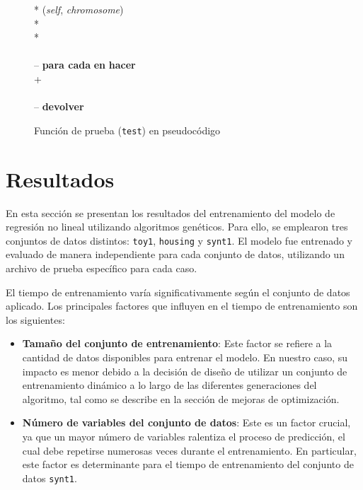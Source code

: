 \documentclass[conference,a4paper]{IEEEtran}
\begin{document}
\begin{figure}[h]
  \centering
  \begin{pseudo}*
    (\textit{self}, \textit{chromosome}) \\*
     \\*
     \\
    \textit{} \\--
    \textbf{para cada} \textit{} \textbf{en} \textit{} \textbf{hacer} \\+
        \textit{} \\
        \textit{} \\--
    \textbf{devolver} \textit{} \\
  \end{pseudo}
  \caption{Función de prueba (\texttt{test}) en pseudocódigo}
  \label{pcd:test}
\end{figure}










\section{Resultados}

En esta sección se presentan los resultados del entrenamiento del modelo de regresión no lineal utilizando algoritmos genéticos. Para ello, se emplearon tres conjuntos de datos distintos: \texttt{toy1}, \texttt{housing} y \texttt{synt1}. El modelo fue entrenado y evaluado de manera independiente para cada conjunto de datos, utilizando un archivo de prueba específico para cada caso.

El tiempo de entrenamiento varía significativamente según el conjunto de datos aplicado. Los principales factores que influyen en el tiempo de entrenamiento son los siguientes:

\begin{itemize}
    \item \textbf{Tamaño del conjunto de entrenamiento}: Este factor se refiere a la cantidad de datos disponibles para entrenar el modelo. En nuestro caso, su impacto es menor debido a la decisión de diseño de utilizar un conjunto de entrenamiento dinámico a lo largo de las diferentes generaciones del algoritmo, tal como se describe en la sección de mejoras de optimización.
    
    \item \textbf{Número de variables del conjunto de datos}: Este es un factor crucial, ya que un mayor número de variables ralentiza el proceso de predicción, el cual debe repetirse numerosas veces durante el entrenamiento. En particular, este factor es determinante para el tiempo de entrenamiento del conjunto de datos \texttt{synt1}.
\end{itemize}
\end{document}
